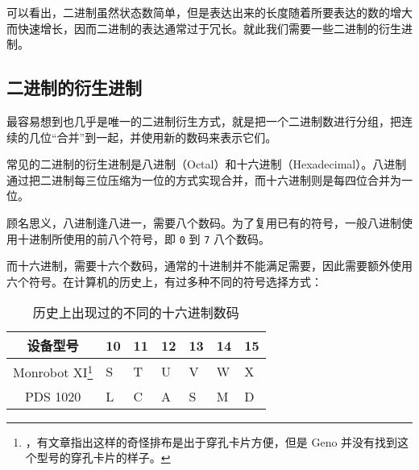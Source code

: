         可以看出，二进制虽然状态数简单，但是表达出来的长度随着所要表达的数的增大而快速增长，因而二进制的表达通常过于冗长。就此我们需要一些二进制的衍生进制。

    \subsection{二进制的衍生进制}\label{subsec:NumberSystemBasics/PositionalNotation/BinaryDerivation}
        最容易想到也几乎是唯一的二进制衍生方式，就是把一个二进制数进行分组，把连续的几位“合并”到一起，并使用新的数码来表示它们。

        常见的二进制的衍生进制是八进制（Octal）和十六进制（Hexadecimal）。八进制通过把二进制每三位压缩为一位的方式实现合并，而十六进制则是每四位合并为一位。

        顾名思义，八进制逢八进一，需要八个数码。为了复用已有的符号，一般八进制使用十进制所使用的前八个符号，即 \texttt{0} 到 \texttt{7} 八个数码。

        而十六进制，需要十六个数码，通常的十进制并不能满足需要，因此需要额外使用六个符号。在计算机的历史上，有过多种不同的符号选择方式：
        \begin{savenotes}
            \begin{table}
                \centering
                \begin{tabular}{|c|l|l|l|l|l|l|}
                    \hline
                    设备型号 & 10 & 11 & 12 & 13 & 14 & 15 \\ \hline
                    Monrobot XI\footnote{\cite[SEXADECIMAL SYSTEM]{monrobot-xi-program-manual}，有文章指出这样的奇怪排布是出于穿孔卡片方便\cite{johnmann-monrobot-xi}，但是 Geno 并没有找到这个型号的穿孔卡片的样子。} & S & T & U & V & W & X \\ \hline
                    PDS 1020 & L & C & A & S & M & D \\ \hline
                \end{tabular}
                \caption{历史上出现过的不同的十六进制数码}
                \label{tab:NumberSystemBasics/PositionalNotation/BinaryDerivation/HistoricalHexadecimalDigits}
            \end{table}
        \end{savenotes}
